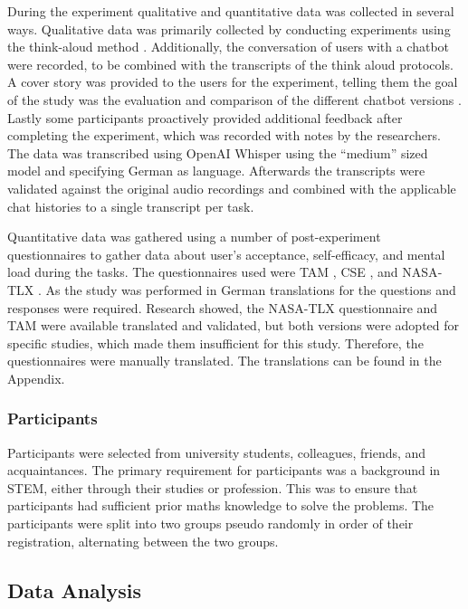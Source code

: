 During the experiment qualitative and quantitative data was collected in several ways. Qualitative data was primarily collected by conducting experiments using the think-aloud method \parencite{VanSomeren1994}. Additionally, the conversation of users with a chatbot were recorded, to be combined with the transcripts of the think aloud protocols. A cover story was provided to the users for the experiment, telling them the goal of the study was the evaluation and comparison of the different chatbot versions \parencite{VanSomeren1994, Jussupow2021}. Lastly some participants proactively provided additional feedback after completing the experiment, which was recorded with notes by the researchers. The data was transcribed using OpenAI Whisper \parencite{Radford2022} using the “medium” sized model and specifying German as language. Afterwards the transcripts were validated against the original audio recordings and combined with the applicable chat histories to a single transcript per task.

Quantitative data was gathered using a number of post-experiment questionnaires to gather data about user's acceptance, self-efficacy, and mental load during the tasks. The questionnaires used were \ac{TAM} \parencite{Davis1989}, \ac{CSE} \parencite{Compeau1995}, and \acs{NASA}-\ac{TLX} \parencite{Hart1988}. As the study was performed in German translations for the questions and responses were required. Research showed, the \acs{NASA}-\ac{TLX} questionnaire \parencite{Flaegel2019} and \ac{TAM} \parencite{Jockisch2010} were available translated and validated, but both versions were adopted for specific studies, which made them insufficient for this study. Therefore, the questionnaires were manually translated. The translations can be found in the Appendix.

\subsubsection{Participants} \label{sssec:participants}

Participants were selected from university students, colleagues, friends, and acquaintances. The primary requirement for participants was a background in \ac{STEM}, either through their studies or profession. This was to ensure that participants had sufficient prior maths knowledge to solve the problems. The participants were split into two groups pseudo randomly in order of their registration, alternating between the two groups.

\subsection{Data Analysis} \label{ssec:data_analysis}

